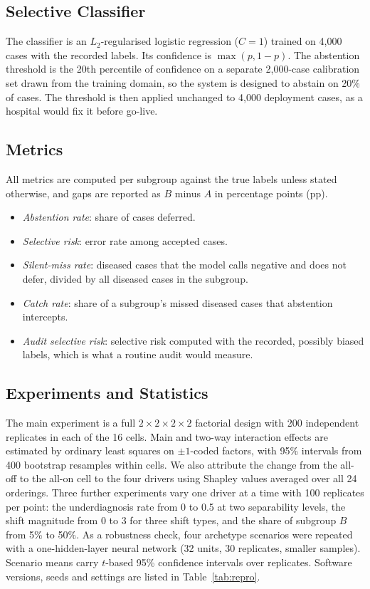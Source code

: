 \documentclass[conference]{IEEEtran}
\begin{document}
\subsection{Selective Classifier}
The classifier is an $L_2$-regularised logistic regression ($C=1$) trained on 4,000 cases with the recorded labels. Its confidence is $\max(p, 1-p)$. The abstention threshold is the 20th percentile of confidence on a separate 2,000-case calibration set drawn from the training domain, so the system is designed to abstain on 20\% of cases. The threshold is then applied unchanged to 4,000 deployment cases, as a hospital would fix it before go-live.

\subsection{Metrics}
All metrics are computed per subgroup against the true labels unless stated otherwise, and gaps are reported as $B$ minus $A$ in percentage points (pp).
\begin{itemize}
\item \emph{Abstention rate}: share of cases deferred.
\item \emph{Selective risk}: error rate among accepted cases.
\item \emph{Silent-miss rate}: diseased cases that the model calls negative and does not defer, divided by all diseased cases in the subgroup.
\item \emph{Catch rate}: share of a subgroup's missed diseased cases that abstention intercepts.
\item \emph{Audit selective risk}: selective risk computed with the recorded, possibly biased labels, which is what a routine audit would measure.
\end{itemize}



\subsection{Experiments and Statistics}
The main experiment is a full $2\times2\times2\times2$ factorial design with 200 independent replicates in each of the 16 cells. Main and two-way interaction effects are estimated by ordinary least squares on $\pm1$-coded factors, with 95\% intervals from 400 bootstrap resamples within cells. We also attribute the change from the all-off to the all-on cell to the four drivers using Shapley values averaged over all 24 orderings. Three further experiments vary one driver at a time with 100 replicates per point: the underdiagnosis rate from 0 to 0.5 at two separability levels, the shift magnitude from 0 to 3 for three shift types, and the share of subgroup $B$ from 5\% to 50\%. As a robustness check, four archetype scenarios were repeated with a one-hidden-layer neural network (32 units, 30 replicates, smaller samples). Scenario means carry $t$-based 95\% confidence intervals over replicates. Software versions, seeds and settings are listed in Table~\ref{tab:repro}.
\end{document}
